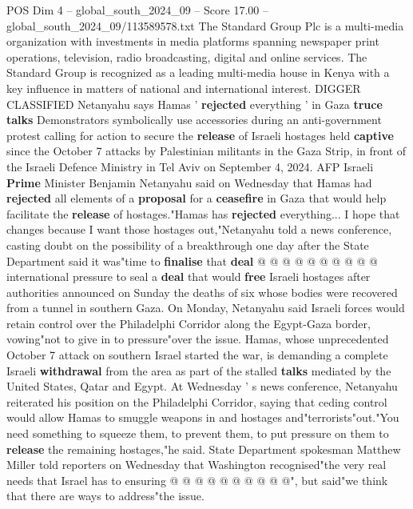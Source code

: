 \begin{textsample}{POS Dim 4 – global\_south\_2024\_09 – Score 17.00 – global\_south\_2024\_09/113589578.txt}  \label{ex:f4_pos_300}
The Standard Group Plc is a multi-media organization with investments in media platforms spanning newspaper print operations, television, radio broadcasting, digital and online services.
The Standard Group is recognized as a leading multi-media house in Kenya with a key influence in matters of national and international interest.
DIGGER CLASSIFIED Netanyahu says Hamas ' \textbf{rejected} everything ' in Gaza \textbf{truce} \textbf{talks} Demonstrators symbolically use accessories during an anti-government protest calling for action to secure the \textbf{release} of Israeli hostages held \textbf{captive} since the October 7 attacks by Palestinian militants in the Gaza Strip, in front of the Israeli Defence Ministry in Tel Aviv on September 4, 2024.
AFP Israeli \textbf{Prime} Minister Benjamin Netanyahu said on Wednesday that Hamas had \textbf{rejected} all elements of a \textbf{proposal} for a \textbf{ceasefire} in Gaza that would help facilitate the \textbf{release} of hostages."Hamas has \textbf{rejected} everything...
I hope that changes because I want those hostages out,"Netanyahu told a news conference, casting doubt on the possibility of a breakthrough one day after the State Department said it was"time to \textbf{finalise} that \textbf{deal} @ @ @ @ @ @ @ @ @ @ international pressure to seal a \textbf{deal} that would \textbf{free} Israeli hostages after authorities announced on Sunday the deaths of six whose bodies were recovered from a tunnel in southern Gaza.
On Monday, Netanyahu said Israeli forces would retain control over the Philadelphi Corridor along the Egypt-Gaza border, vowing"not to give in to pressure"over the issue.
Hamas, whose unprecedented October 7 attack on southern Israel started the war, is demanding a complete Israeli \textbf{withdrawal} from the area as part of the stalled \textbf{talks} mediated by the United States, Qatar and Egypt.
At Wednesday ' s news conference, Netanyahu reiterated his position on the Philadelphi Corridor, saying that ceding control would allow Hamas to smuggle weapons in and hostages and"terrorists"out."You need something to squeeze them, to prevent them, to put pressure on them to \textbf{release} the remaining hostages,"he said.
State Department spokesman Matthew Miller told reporters on Wednesday that Washington recognised"the very real needs that Israel has to ensuring @ @ @ @ @ @ @ @ @ @", but said"we think that there are ways to address"the issue.

\end{textsample}
